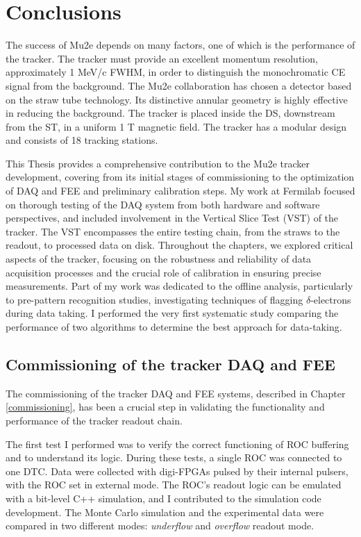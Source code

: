 \chapter{Conclusions}\label{conclusions}
The success of Mu2e depends on many factors, 
one of which is the performance of the tracker. 
The tracker must provide an excellent momentum 
resolution, approximately 1 MeV/c FWHM, 
in order to distinguish the monochromatic CE 
signal from the background. 
The Mu2e collaboration has chosen a detector 
based on the straw tube technology.  
Its distinctive annular geometry is highly 
effective in reducing the background. 
The tracker is placed inside the 
DS, downstream from the ST, 
in a uniform 1 T magnetic field. The tracker  
has a modular design and consists of 18 tracking stations.

This Thesis provides a comprehensive 
contribution to the Mu2e tracker 
development, covering from its initial stages of 
commissioning to the optimization 
of DAQ and FEE and preliminary calibration 
steps. My work at Fermilab 
focused on thorough testing of the DAQ system 
from both hardware and 
software perspectives, and included 
involvement in the Vertical Slice Test 
(VST) of the tracker. 
The VST encompasses the entire testing 
chain, from the straws to the readout, 
to processed data on disk.
Throughout the chapters, we explored 
critical aspects of the tracker, focusing on the robustness and 
reliability of data acquisition 
processes and the crucial role of 
calibration in ensuring precise measurements. 
Part of my work was dedicated to the offline 
analysis, particularly to pre-pattern recognition 
studies, investigating techniques of   
flagging $\delta$-electrons during data taking. 
I performed the very first systematic study 
comparing the performance of two algorithms 
to determine the best approach for data-taking. 
\section{Commissioning of the tracker DAQ and FEE}
The commissioning of the tracker DAQ and FEE 
systems, described in Chapter 
\ref{commissioning}, has been a crucial step 
in validating the functionality 
and performance of the tracker readout chain.

The first test I performed was to verify the 
correct functioning of 
ROC buffering and to understand its logic. 
During these tests, a single 
ROC was connected to one DTC. Data were 
collected with digi-FPGAs pulsed 
by their internal pulsers, with the ROC set 
in external mode. The ROC's  
readout logic can be emulated with a bit-level 
C++ simulation, and I contributed to the simulation code development. 
The Monte Carlo simulation 
and the experimental data were compared in two different modes: 
\textit{underflow} and \textit{overflow} readout mode.

